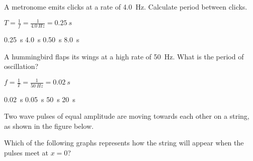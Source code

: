 \documentclass[answers]{exam}
\begin{document}
\begin{questions}
\question
A metronome emits clicks at a rate of \SI{4.0}{Hz}. Calculate period between clicks. 

\ifprintanswers
{\color{red}
$T = \frac{1}{f} = \frac{1}{\SI{4.0}{Hz}} = \boxed{\SI{0.25}{s}}$

\medskip
}
\fi

\begin{randomizechoices}
    \correctchoice \SI{0.25}{s}
    \choice \SI{4.0}{s}
    \choice \SI{0.50}{s}
    \choice \SI{8.0}{s}
\end{randomizechoices}

\question
A hummingbird flaps its wings at a high rate of \SI{50}{Hz}. What is the period of oscillation?

\ifprintanswers
{\color{red}
$f = \frac{1}{T} = \frac{1}{\SI{50}{Hz}} = \boxed{\SI{0.02}{s}}$

\medskip
}
\fi

\begin{randomizeoneparchoices}
    \correctchoice \SI{0.02}{s}
    \choice \SI{0.05}{s}
    \choice \SI{50}{s}
    \choice \SI{20}{s}
\end{randomizeoneparchoices}

\ifprintanswers
\else
\clearpage
\fi

\question
Two wave pulses of equal amplitude are moving towards each other on a string, as shown in the figure below.


\begin{center}
\end{center}

Which of the following graphs represents how the string will appear when the pulses meet at $x=0$?



\end{questions}
\end{document}
